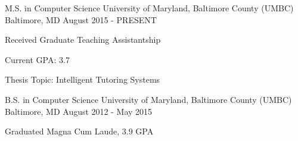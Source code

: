 \begin{cventries}
    \cventry
        {M.S. in Computer Science}
        {University of Maryland, Baltimore County (UMBC)}
        {Baltimore, MD}
        {August 2015 - PRESENT}
        {
            \begin{cvitems}
                \item {Received Graduate Teaching Assistantship}
                \item {Current GPA: 3.7}
                \item {Thesis Topic: Intelligent Tutoring Systems}
            \end{cvitems}
        }
    \cventry
        {B.S. in Computer Science}
        {University of Maryland, Baltimore County (UMBC)}
        {Baltimore, MD}
        {August 2012 - May 2015}
        {
            \begin{cvitems}
            \item {Graduated Magna Cum Laude, 3.9 GPA}
            \end{cvitems}
        }
\end{cventries}
